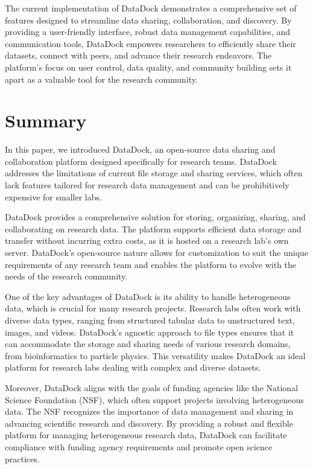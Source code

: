 \documentclass[conference]{IEEEtran}
\begin{document}
The current implementation of DataDock demonstrates a comprehensive set of features designed to streamline data sharing, collaboration, and discovery. By providing a user-friendly interface, robust data management capabilities, and communication tools, DataDock empowers researchers to efficiently share their datasets, connect with peers, and advance their research endeavors. The platform's focus on user control, data quality, and community building sets it apart as a valuable tool for the research community.

\section{Summary}
In this paper, we introduced DataDock, an open-source data sharing and collaboration platform designed specifically for research teams. DataDock addresses the limitations of current file storage and sharing services, which often lack features tailored for research data management and can be prohibitively expensive for smaller labs.

DataDock provides a comprehensive solution for storing, organizing, sharing, and collaborating on research data. The platform supports efficient data storage and transfer without incurring extra costs, as it is hosted on a research lab's own server. DataDock's open-source nature allows for customization to suit the unique requirements of any research team and enables the platform to evolve with the needs of the research community.

One of the key advantages of DataDock is its ability to handle heterogeneous data, which is crucial for many research projects. Research labs often work with diverse data types, ranging from structured tabular data to unstructured text, images, and videos. DataDock's agnostic approach to file types ensures that it can accommodate the storage and sharing needs of various research domains, from bioinformatics to particle physics. This versatility makes DataDock an ideal platform for research labs dealing with complex and diverse datasets.

Moreover, DataDock aligns with the goals of funding agencies like the National Science Foundation (NSF), which often support projects involving heterogeneous data. The NSF recognizes the importance of data management and sharing in advancing scientific research and discovery. By providing a robust and flexible platform for managing heterogeneous research data, DataDock can facilitate compliance with funding agency requirements and promote open science practices.
\end{document}
